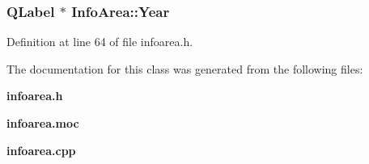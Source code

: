 \subsubsection{\setlength{\rightskip}{0pt plus 5cm}QLabel $\ast$ {\bf Info\-Area::Year}\hspace{0.3cm}{\tt  [private]}}\label{classInfoArea_InfoArear5}




Definition at line 64 of file infoarea.h.

The documentation for this class was generated from the following files:\begin{CompactItemize}
\item 
{\bf infoarea.h}\item 
{\bf infoarea.moc}\item 
{\bf infoarea.cpp}\end{CompactItemize}
